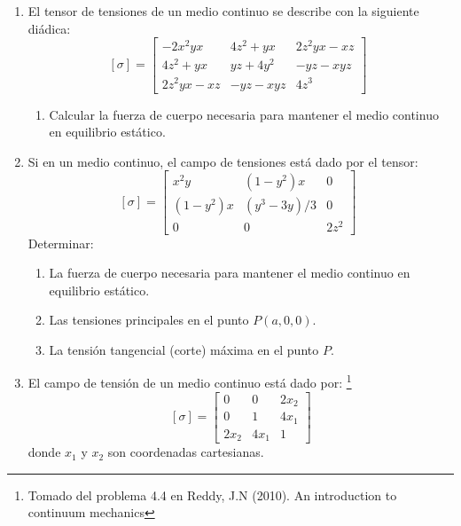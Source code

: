 \documentclass[../notas medios.tex]{subfiles}
\begin{document}
\begin{enumerate}
\item \label{punto04} El tensor de tensiones de un medio continuo se describe
con la siguiente di\'adica:
		\[ [\sigma] = \left[ \begin{array}{ccc}
		-2x^2yx & 4z^2+yx & 2z^2yx-xz \\ 
		4z^2+yx & yz+4y^2 & -yz-xyz \\ 
		2z^2yx-xz & -yz-xyz & 4z^3
		\end{array}  \right] \enspace\]
	\begin{enumerate}
		\item Calcular la fuerza de cuerpo necesaria para mantener el medio continuo en equilibrio est\'atico.
	\end{enumerate}
\item \label{punto05} Si en un medio continuo, el campo de tensiones est\'a dado
por el tensor:
		\[ [\sigma] = \left[ \begin{array}{ccc}
		x^2y & (1-y^2)x & 0 \\ 
		(1-y^2)x & (y^3-3y)/3 & 0 \\ 
		0 & 0 & 2z^2
		\end{array}  \right]\enspace \]
	Determinar:
	\begin{enumerate}
		\item La fuerza de cuerpo necesaria para mantener el medio continuo en equilibrio est\'atico.
		\item Las tensiones principales en el punto $P(a,0,0)$.
		\item La tensi\'on tangencial (corte) m\'axima en el punto $P$.
	\end{enumerate}
\item  \label{punto06} El campo de tensi\'on de un medio continuo está dado por: \footnote{Tomado del problema 4.4 en Reddy, J.N (2010). An introduction to continuum mechanics}
		\[[\sigma] = \left[ \begin{array}{ccc}
		0 & 0 & 2x_2 \\ 
		0 & 1 & 4x_1 \\ 
		2x_2 & 4x_1 & 1
		\end{array}  \right] \]
	donde $x_1$ y $x_2$ son coordenadas cartesianas.


\end{enumerate}
\end{document}
